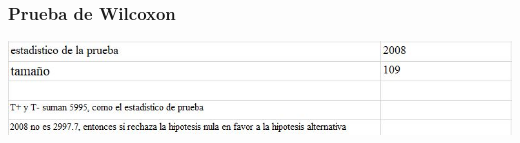 \begin{frame}
    \frametitle{Prueba de Wilcoxon}
    \includegraphics[width=1\textwidth]{cap/images/wilcoxon/resultados.jpg}
\end{frame}